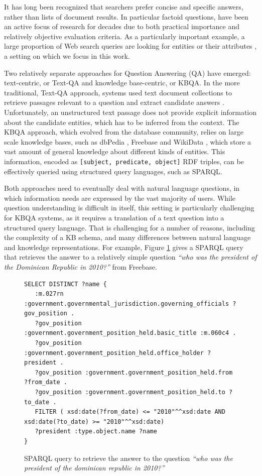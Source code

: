 It has long been recognized that searchers prefer concise and specific answers, rather than lists of document results. In particular factoid questions, have been an active focus of research for decades due to both practical importance and relatively objective evaluation criteria.
As a particularly important example, a large proportion of Web search queries are looking for entities or their attributes \cite{Pound:2010:AOR:1772690.1772769}, a setting on which we focus in this work. 

Two relatively separate approaches for Question Answering (QA) have emerged: text-centric, or Text-QA and knowledge base-centric, or KBQA.
In the more traditional, Text-QA approach, systems used text document collections to retrieve passages relevant to a question and extract candidate answers \cite{dang2007overview}.
Unfortunately, an unstructured text passage does not provide explicit information about the candidate entities, which has to be inferred from the context.
The KBQA approach, which evolved from the database community, relies on large scale knowledge bases, such as dbPedia \cite{auer2007dbpedia}, Freebase \cite{Bollacker:2008:FCC:1376616.1376746} and WikiData \cite{Vrandecic:2014:WFC:2661061.2629489}, which store a vast amount of general knowledge about different kinds of entities.
This information, encoded as \texttt{[subject, predicate, object]} RDF triples, can be effectively queried using structured query languages, such as SPARQL.

Both approaches need to eventually deal with natural language questions, in which information needs are expressed by the vast majority of users.
While question understanding is difficult in itself, this setting is particularly challenging for KBQA systems, as it requires a translation of a text question into a structured query language.
That is challenging for a number of reasons, including the complexity of a KB schema, and many differences between natural language and knowledge representations. 
For example, Figure \ref{fig:example_sparql} gives a SPARQL query that retrieves the answer to a relatively simple question \textit{``who was the president of the Dominican Republic in 2010?''} from Freebase.

\begin{figure}
\centering
\begin{lstlisting}[frame=single,basicstyle=\small]
SELECT DISTINCT ?name {
   :m.027rn :government.governmental_jurisdiction.governing_officials ?gov_position .
   ?gov_position :government.government_position_held.basic_title :m.060c4 .
   ?gov_position :government.government_position_held.office_holder ?president .
   ?gov_position :government.government_position_held.from ?from_date .
   ?gov_position :government.government_position_held.to ?to_date .
   FILTER ( xsd:date(?from_date) <= "2010"^^xsd:date AND xsd:date(?to_date) >= "2010"^^xsd:date)
   ?president :type.object.name ?name
}
\end{lstlisting}
\vspace{-4mm}
\caption{SPARQL query to retrieve the answer to the question \textit{``who was the president of the dominican republic in 2010?''}}
\label{fig:example_sparql}
\end{figure}


